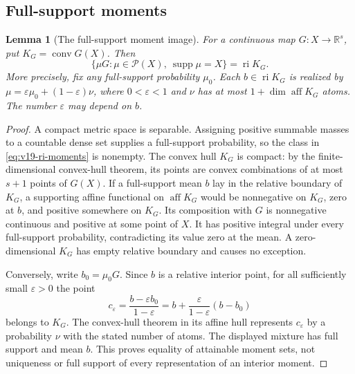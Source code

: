 \documentclass[11pt]{amsart}
\newtheorem{lemma}[theorem]{Lemma}
\theoremstyle{definition}\newtheorem{definition}[theorem]{Definition}
\theoremstyle{remark}\newtheorem{remark}[theorem]{Remark}
\newcommand{\R}{\mathbb R}\newcommand{\N}{\mathbb N}\newcommand{\C}{\mathbb C}
\newcommand{\cP}{\mathcal P}\newcommand{\cG}{\mathcal G}
\begin{document}
\subsection{Full-support moments}
\begin{lemma}[The full-support moment image]
\label{lem:v19-moment-image}
For a continuous map $G:X\to\R^s$, put $K_G=\operatorname{conv}G(X)$.
Then
\begin{equation}\label{eq:v19-ri-moments}
 \{\mu G:\mu\in\cP(X),\ \operatorname{supp}\mu=X\}
       =\operatorname{ri}K_G.
\end{equation}
More precisely, fix any full-support probability $\mu_0$. Each
$b\in\operatorname{ri}K_G$ is realized by
$\mu=\varepsilon\mu_0+(1-\varepsilon)\nu$, where $0<\varepsilon<1$
and $\nu$ has at most $1+\dim\operatorname{aff}K_G$ atoms.
The number $\varepsilon$ may depend on $b$.
\end{lemma}
\begin{proof}
A compact metric space is separable. Assigning positive summable masses
to a countable dense set supplies a full-support probability, so the
class in \eqref{eq:v19-ri-moments} is nonempty. The convex hull $K_G$
is compact: by the finite-dimensional convex-hull theorem, its points
are convex combinations of at most $s+1$ points of $G(X)$.
If a full-support mean $b$ lay in the relative boundary of $K_G$, a
supporting affine functional on $\operatorname{aff}K_G$ would be
nonnegative on $K_G$, zero at $b$, and positive somewhere on $K_G$.
Its composition with $G$ is nonnegative continuous and positive at
some point of $X$. It has positive integral under every full-support
probability, contradicting its value zero at the mean. A zero-dimensional
$K_G$ has empty relative boundary and causes no exception.

Conversely, write $b_0=\mu_0G$. Since $b$ is a relative interior point,
for all sufficiently small $\varepsilon>0$ the point
\[
 c_\varepsilon=\frac{b-\varepsilon b_0}{1-\varepsilon}
             =b+\frac{\varepsilon}{1-\varepsilon}(b-b_0)
\]
belongs to $K_G$. The convex-hull theorem in its affine hull represents
$c_\varepsilon$ by a probability $\nu$ with the stated number of atoms.
The displayed mixture has full support and mean $b$.
This proves equality of attainable moment sets, not uniqueness or
full support of every representation of an interior moment.
\end{proof}
\end{document}
